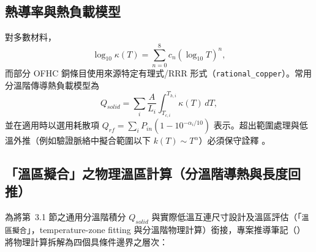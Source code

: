 \documentclass[11pt,a4paper]{article}
\begin{document}
\subsection{熱導率與熱負載模型}
對多數材料，
\begin{equation}
\log_{10}\kappa(T)=\sum_{n=0}^{8} c_n \left(\log_{10}T\right)^n,
\end{equation}
而部分 OFHC 銅條目使用來源特定有理式/RRR 形式（\texttt{rational\_copper}）\cite{simon1992,nist,marquardt,bradley}。常用分溫階傳導熱負載模型為
\begin{equation}
Q_{solid}=\sum_i \frac{A}{L_i}\int_{T_{c,i}}^{T_{h,i}}\kappa(T)\,dT,
\end{equation}
並在適用時以選用耗散項 $Q_{rf}=\sum_i P_{in}\left(1-10^{-\alpha_i/10}\right)$ 表示。超出範圍處理與低溫外推（例如驗證脈絡中擬合範圍以下 $k(T)\sim T^\alpha$）必須保守詮釋 \cite{flynn,raicu2025}。

\subsection{「溫區擬合」之物理溫區計算（分溫階導熱與長度回推）}
為將第~3.1 節之通用分溫階積分 $Q_{solid}$ 與實際低溫互連尺寸設計及溫區評估（「\texttt{溫區擬合}」，temperature-zone fitting 與分溫階物理計算）銜接，專案推導筆記（）將物理計算拆解為四個具條件邊界之層次：
\end{document}
